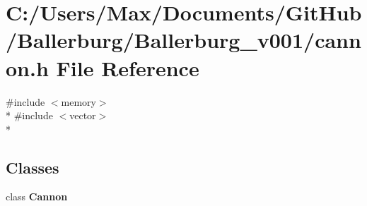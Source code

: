 \section{C\+:/\+Users/\+Max/\+Documents/\+Git\+Hub/\+Ballerburg/\+Ballerburg\+\_\+v001/cannon.h File Reference}
\label{cannon_8h}
{\ttfamily \#include $<$memory$>$}\\*
{\ttfamily \#include $<$vector$>$}\\*
\subsection*{Classes}
\begin{DoxyCompactItemize}
\item 
class {\bf Cannon}
\end{DoxyCompactItemize}
